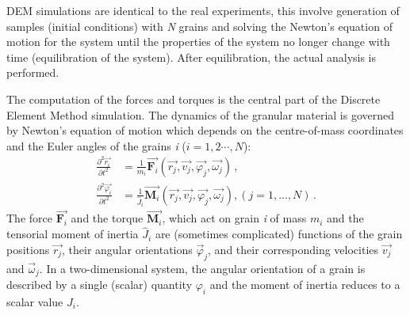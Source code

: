 DEM simulations are identical to the real experiments, this involve generation 
of samples (initial conditions) with \textit{N} grains and solving the Newton's 
equation of motion for the system until the properties of the system no longer 
change with time (equilibration of the system). After equilibration, the actual 
analysis is performed.

The computation of the forces and torques is the central part of the Discrete 
Element Method simulation. The dynamics of the granular material is governed by 
Newton's equation of motion which depends on the centre-of-mass coordinates and 
the Euler angles of the grains \textit{i} ($i = 1, 2 \cdots , N$):
%
\begin{align} 
\frac{{{\partial}^2}{\overrightarrow{r_i}}}{\partial{t^2}} 
&=\frac{1}{m_i}\overrightarrow{{\mathbf{F}}_{i}}(\overrightarrow{r_j},\overrightarrow{v_j},
 \overrightarrow{\varphi_j},\overrightarrow{\omega_j}) \,, \\ 
\frac{{\partial^2}{\overrightarrow{\varphi_i}}}{\partial{t^2}}&
=\frac{1}{{\hat{J}}_i}\overrightarrow{\mathbf{M}_i}
(\overrightarrow{r_j},\overrightarrow{v_j},\overrightarrow{\varphi_j},
   \overrightarrow{\omega_j}), (j=1,...,N) \,.
\end{align}
%
The force $\overrightarrow{\mathbf{F}_{i}}$ and the torque 
$\overrightarrow{\mathbf{M}_{i}}$, which act on grain \textit{i} of mass 
$\mathit{m}_{\mathit{i}}$ and the tensorial moment of inertia 
${\hat{J}_i}$ are (sometimes complicated) functions of the grain 
positions $\overrightarrow{\mathit{r}_{\mathit{j}}}$, their angular 
orientations $\overrightarrow{\varphi}_{\mathit{j}}$, and their corresponding 
velocities $\overrightarrow{\mathit{v}_{\mathit{j}}}$ and 
$\overrightarrow{\omega}_{\mathit{j}}$. In a two-dimensional system, the 
angular orientation of a grain is described by a single (scalar) quantity 
$\varphi_{i}$ and the moment of inertia reduces to a scalar value 
$\mathit{J}_{i}$. 
%	
%	


